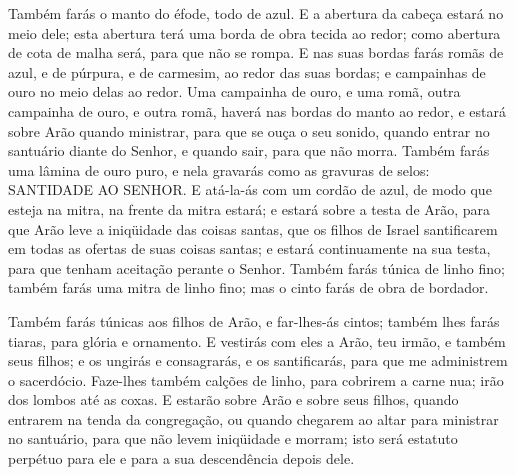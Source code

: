 Também farás o manto do éfode, todo de azul. E a abertura
da cabeça estará no meio dele; esta abertura terá uma borda de obra
tecida ao redor; como abertura de cota de malha será, para que não
se rompa. E nas suas bordas farás romãs de azul, e de
púrpura, e de carmesim, ao redor das suas bordas; e campainhas de
ouro no meio delas ao redor. Uma campainha de ouro, e uma
romã, outra campainha de ouro, e outra romã, haverá nas bordas do
manto ao redor, e estará sobre Arão quando ministrar, para
que se ouça o seu sonido, quando entrar no santuário diante do
Senhor, e quando sair, para que não morra. Também farás uma
lâmina de ouro puro, e nela gravarás como as gravuras de selos:
SANTIDADE AO SENHOR. E atá-la-ás com um cordão de azul, de
modo que esteja na mitra, na frente da mitra estará; e estará
sobre a testa de Arão, para que Arão leve a iniqüidade das coisas
santas, que os filhos de Israel santificarem em todas as ofertas de
suas coisas santas; e estará continuamente na sua testa, para que
tenham aceitação perante o Senhor. Também farás túnica de
linho fino; também farás uma mitra de linho fino; mas o cinto farás
de obra de bordador.

Também farás túnicas aos filhos de Arão, e far-lhes-ás cintos;
também lhes farás tiaras, para glória e ornamento. E vestirás
com eles a Arão, teu irmão, e também seus filhos; e os ungirás e
consagrarás, e os santificarás, para que me administrem o
sacerdócio. Faze-lhes também calções de linho, para cobrirem
a carne nua; irão dos lombos até as coxas. E estarão sobre
Arão e sobre seus filhos, quando entrarem na tenda da congregação,
ou quando chegarem ao altar para ministrar no santuário, para que
não levem iniqüidade e morram; isto será estatuto perpétuo para ele
e para a sua descendência depois dele.

\medskip

